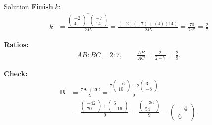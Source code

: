 \documentclass{beamer}
\theoremstyle{remark}
\newcommand{\myvec}[1]{\ensuremath{\begin{pmatrix}#1\end{pmatrix}}}
\let\vec\mathbf
\begin{document}
\begin{frame}[t]{Solution}
\small
\textbf{Finish }$k$:
\begin{align*}
k&=\frac{\myvec{-2\\4}^{\!\top}\myvec{-7\\14}}{245}
=\frac{(-2)(-7)+(4)(14)}{245}
=\frac{70}{245}
=\boxed{\tfrac{2}{7}}
\end{align*}

\textbf{Ratios:}
\begin{align*}
AB:BC=\boxed{2:7},\qquad
\frac{AB}{AC}=\frac{2}{2+7}=\boxed{\tfrac{2}{9}}.
\end{align*}

\textbf{Check:}
\begin{align*}
\vec{B}
&=\frac{7\vec{A}+2\vec{C}}{9}
=\frac{7\myvec{-6\\10}+2\myvec{3\\-8}}{9}\\
&=\frac{\myvec{-42\\70}+\myvec{6\\-16}}{9}
=\frac{\myvec{-36\\54}}{9}
=\myvec{-4\\6}.
\end{align*}
\end{frame}
\end{document}

